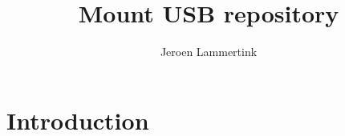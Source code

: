 \newcommand*{\BEAMERCLASS}{}


\title{Mount USB repository}
\author{Jeroen Lammertink}
\begin{frame}
\titlepage
\end{frame}
\newcommand{\TOEXECUTE}{\lstinline[language=,basicstyle=\ttfamily]!flying_start_share000.exe!}
\section{Introduction}


